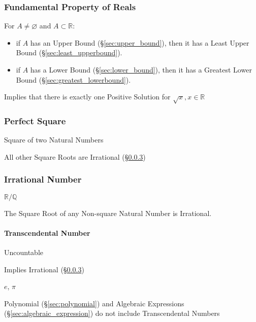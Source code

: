\subsubsection{Fundamental Property of Reals}
\label{sec:fundamental_property}

For $A \neq \varnothing$ and $A \subset \mathbb{R}$:
\begin{itemize}
  \item if $A$ has an Upper Bound (\S\ref{sec:upper_bound}), then it
    has a Least Upper Bound (\S\ref{sec:least_upperbound}).
  \item if $A$ has a Lower Bound (\S\ref{sec:lower_bound}), then it
    has a Greatest Lower Bound (\S\ref{sec:greatest_lowerbound}).
\end{itemize}

Implies that there is exactly one Positive Solution for $\sqrt{x}, x
\in \mathbb{R}$



\subsubsection{Perfect Square}\label{sec:perfect_square}

Square of two Natural Numbers

All other Square Roots are Irrational (\S\ref{sec:irrational})



\subsubsection{Irrational Number}\label{sec:irrational}

$\mathbb{R}/\mathbb{Q}$

The Square Root of any Non-square Natural Number is Irrational.



\paragraph{Transcendental Number}\label{sec:transcendental}\hfill

Uncountable

Implies Irrational (\S\ref{sec:irrational})

$e$, $\pi$

Polynomial (\S\ref{sec:polynomial}) and Algebraic Expressions
(\S\ref{sec:algebraic_expression}) do not include Transcendental Numbers



